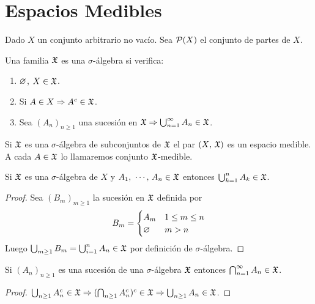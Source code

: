 \clearpage

\section{Espacios Medibles}

Dado \(X\) un conjunto arbitrario no vacío. Sea \(\mathcal{P}(X)\) el conjunto de partes de \(X\).

\begin{definition}
    Una familia \(\mathfrak{X}\) es una \(\sigma\)-álgebra si verifica:
    \begin{enumerate}
        \item \(\varnothing\), \(X \in \mathfrak{X}\).
        \item Si \(A \in X \Rightarrow A^c \in \mathfrak{X}\).
        \item Sea \((A_n)_{n \geq 1}\) una sucesión en \(\mathfrak{X} \Rightarrow \bigcup_{n=1}^{\infty} A_n \in \mathfrak{X}\).
    \end{enumerate}
\end{definition}

\begin{definition}
    Si \(\mathfrak{X}\) es una \(\sigma\)-álgebra de subconjuntos de \(\mathfrak{X}\) el par \((X\text{, }\mathfrak{X})\) es un espacio medible. A cada \(A \in \mathfrak{X}\)
    lo llamaremos conjunto \(\mathfrak{X}\)-medible.
\end{definition}

\begin{note}
    Si \(\mathfrak{X}\) es una \(\sigma\)-álgebra de \(X\) y \(A_1 \text{, } \cdots \text{, } A_n \in \mathfrak{X}\) entonces \(\bigcup_{k=1}^{n} A_k \in \mathfrak{X}\).
    \begin{proof}
        Sea \((B_m)_{m \geq 1}\) la sucesión en \(\mathfrak{X}\) definida por \begin{equation*}
            B_m = \begin{cases}
                A_m & 1 \leq m \leq n \\
                \varnothing  & m > n
            \end{cases}
        \end{equation*}
        Luego \(\bigcup_{m \geq 1} B_m = \bigcup_{i = 1}^n A_n \in \mathfrak{X}\) por definición de \(\sigma\)-álgebra.
    \end{proof}
\end{note}

\begin{note}
    Si \((A_n)_{n \geq 1}\) es una sucesión de una \(\sigma\)-álgebra \(\mathfrak{X}\) entonces \(\bigcap_{n=1}^{\infty} A_n \in \mathfrak{X}\).
    \begin{proof}
        \(\bigcup_{n \geq 1} A_n^c \in \mathfrak{X} \Rightarrow (\bigcap_{n \geq 1} A_n^c)^c \in \mathfrak{X} \Rightarrow \bigcup_{n \geq 1} A_n \in \mathfrak{X}\).
    \end{proof}
\end{note}


